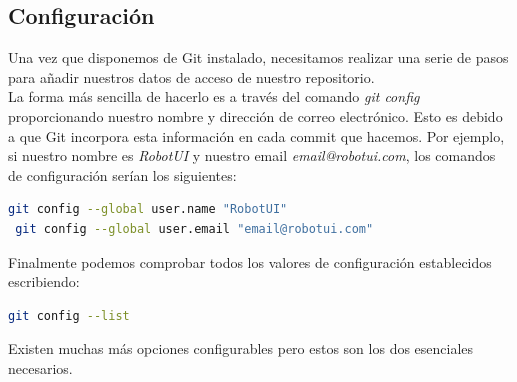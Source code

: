 \begin{appendix}
\subsection{Configuración}

Una vez que disponemos de Git instalado, necesitamos realizar una serie de pasos para añadir nuestros datos de acceso de nuestro repositorio.\\

La forma más sencilla de hacerlo es a través del comando \emph{git config} proporcionando nuestro nombre y dirección de correo electrónico. Esto es debido a que Git incorpora esta información en cada commit
que hacemos. Por ejemplo, si nuestro nombre es \emph{RobotUI} y nuestro email \emph{email@robotui.com}, los comandos de configuración serían los siguientes:\\

\begin{lstlisting}[language=bash]
 git config --global user.name "RobotUI"
 git config --global user.email "email@robotui.com"
\end{lstlisting}

Finalmente podemos comprobar todos los valores de configuración establecidos escribiendo:\\

\begin{lstlisting}[language=bash]
git config --list
\end{lstlisting}

Existen muchas más opciones configurables pero estos son los dos esenciales necesarios.\\

\end{appendix}





